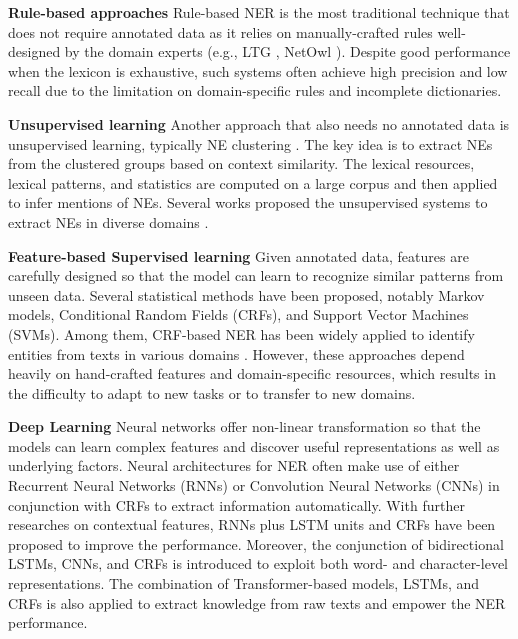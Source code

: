 \documentclass[runningheads]{llncs}
\begin{document}
\noindent \textbf{Rule-based approaches}
Rule-based NER is the most traditional technique that does not require annotated data as it relies on  manually-crafted rules well-designed by the domain experts (e.g., LTG \cite{mikheev1999named}, NetOwl \cite{krupka2005description}). Despite good performance when the lexicon is exhaustive, such systems often achieve high precision and low recall due to the limitation on domain-specific rules and incomplete dictionaries.

\noindent \textbf{Unsupervised learning}
Another approach that also needs no annotated data is unsupervised learning, typically NE clustering \cite{collins1999unsupervised}. The key idea is to extract NEs from the clustered groups based on context similarity. The lexical resources, lexical patterns, and statistics are computed on a large corpus and then applied to infer mentions of NEs. Several works proposed the unsupervised systems to extract NEs in diverse domains \cite{etzioni2005unsupervised,nadeau2006unsupervised}.

\noindent \textbf{Feature-based Supervised learning}
Given annotated data, features are carefully designed so that the model can learn to recognize similar patterns from unseen data. Several statistical methods have been proposed, notably Markov models, Conditional Random Fields (CRFs), and Support Vector Machines (SVMs). Among them, CRF-based NER has been widely applied to identify entities from texts in various domains \cite{liu2020hamner,ritter2011named,rocktaschel2012chemspot}.
However, these approaches depend heavily on hand-crafted features and domain-specific resources, which results in the difficulty to adapt to new tasks or to transfer to new domains.

\noindent \textbf{Deep Learning}
Neural networks offer non-linear transformation so that the models can learn complex features and discover useful representations as well as underlying factors. Neural architectures for NER often make use of either Recurrent  Neural  Networks (RNNs)  or  Convolution  Neural  Networks (CNNs) in conjunction with  CRFs \cite{chiu2016named} to  extract information automatically. With further researches on contextual features, RNNs plus LSTM units and  CRFs have been proposed \cite{lample2016neural} to improve the performance.  Moreover, the conjunction of bidirectional LSTMs, CNNs, and CRFs \cite{ma2016end} is introduced to exploit both word- and character-level representations. The combination of Transformer-based models, LSTMs, and CRFs \cite{liu2018empower} is also applied to extract knowledge from raw texts and empower the NER performance. 
\vspace{-0.3cm}
\end{document}
